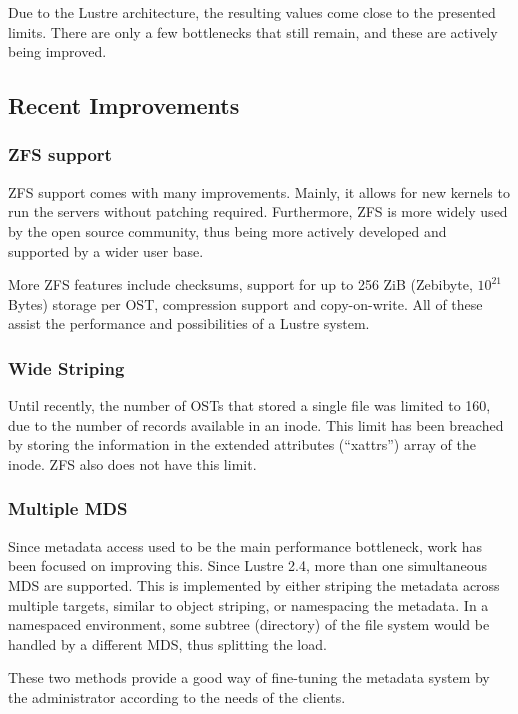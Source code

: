    Due to the Lustre architecture, the resulting values come close to the
    presented limits. There are only a few bottlenecks that still remain, and
    these are actively being improved.

\subsection{Recent Improvements}

\subsubsection{ZFS support}

ZFS support comes with many improvements. Mainly, it allows for new kernels to
run the servers without patching required. Furthermore, ZFS is more widely used
by the open source community, thus being more actively developed and supported
by a wider user base.

More ZFS features include checksums, support for up to 256 ZiB (Zebibyte,
$10^21$ Bytes) storage per OST, compression support and copy-on-write. All of
these assist the performance and possibilities of a Lustre system.

\subsubsection{Wide Striping}

Until recently, the number of OSTs that stored a single file was limited to 160,
due to the number of records available in an inode. This limit has been breached
by storing the information in the extended attributes (``xattrs'') array of the
inode. ZFS also does not have this limit.

\subsubsection{Multiple MDS}

Since metadata access used to be the main performance bottleneck, work has been
focused on improving this. Since Lustre 2.4, more than one simultaneous MDS
are supported. This is implemented by either striping the metadata across
multiple targets, similar to object striping, or namespacing the metadata. In a
namespaced environment, some subtree (directory) of the file system would be
handled by a different MDS, thus splitting the load.

These two methods provide a good way of fine-tuning the metadata system by the
administrator according to the needs of the clients.

